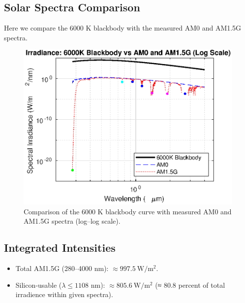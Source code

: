 \documentclass[11pt,a4paper]{article}
\begin{document}
\FloatBarrier

\subsection{Solar Spectra Comparison}
Here we compare the 6000 K blackbody with the measured AM0 and AM1.5G spectra.

\begin{figure}[H]
  \centering
  \includegraphics[width=0.8\linewidth]{blackbody_vs_solar.eps}
  \caption{Comparison of the 6000 K blackbody curve with measured AM0 and AM1.5G spectra (log–log scale).}
  \label{fig:solar}
\end{figure}

\FloatBarrier

\subsection{Integrated Intensities}
\begin{itemize}
  \item Total AM1.5G (280–4000 nm): \(\approx 997.5~\mathrm{W/m^2}\).
  \item Silicon‐usable (\(\lambda \le 1108\) nm): \(\approx 805.6~\mathrm{W/m^2}\) (≈ 80.8 percent of total irradience within given spectra).
\end{itemize}
\end{document}
